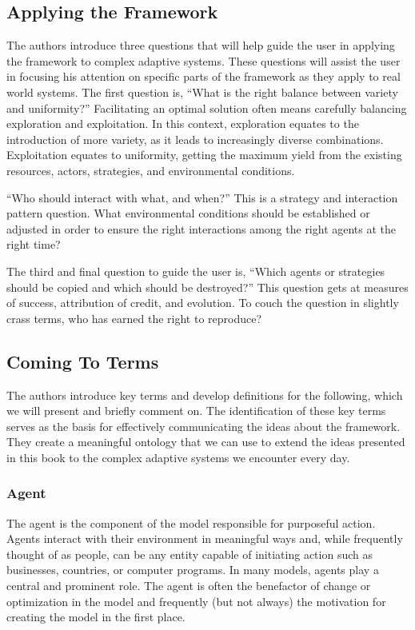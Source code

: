 \documentclass[jou,apacite]{apa6}
\begin{document}
\subsection{Applying the Framework}

The authors introduce three questions that will help guide the user in applying the framework to complex adaptive systems.  These questions will assist the user in focusing his attention on specific parts of the framework as they apply to real world systems.  The first question is, ``What is the right balance between variety and uniformity?''  Facilitating an optimal solution often means carefully balancing exploration and exploitation.  In this context, exploration equates to the
introduction of more variety, as it leads to increasingly diverse combinations.  Exploitation equates to uniformity, getting the maximum yield from the existing resources, actors, strategies, and environmental conditions.

``Who should interact with what, and when?''  This is a strategy and interaction pattern question.  What environmental conditions should be established or adjusted in order to ensure the right interactions among the right agents at the right time?

The third and final question to guide the user is, ``Which agents or strategies should be copied and which should be destroyed?''  This question gets at measures of success, attribution of credit, and evolution.  To couch the question in slightly crass terms, who has earned the right to reproduce?

\subsection{Coming To Terms}

The authors introduce key terms and develop definitions for the following, which we will present and briefly comment on.  The identification of these key terms serves as the basis for effectively communicating the ideas about the framework. They create a meaningful ontology that we can use to extend the ideas presented in this book to the complex adaptive systems we encounter every day.

\subsubsection{Agent}
The agent is the component of the model responsible for purposeful action.  Agents interact with their environment in meaningful ways and, while frequently thought of as people, can be any entity capable of initiating action such as businesses, countries, or computer programs.  In many models, agents play a central and prominent role.  The agent is often the benefactor of change or optimization in the model and frequently (but not always) the motivation for creating the model in the first place.
\end{document}
